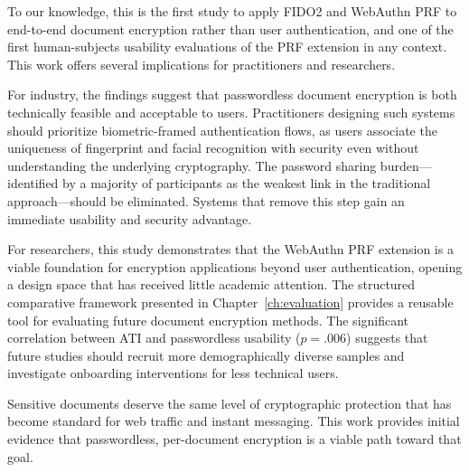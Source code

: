 To our knowledge, this is the first study to apply FIDO2 and WebAuthn PRF to end-to-end document encryption rather than user authentication, and one of the first human-subjects usability evaluations of the PRF extension in any context. This work offers several implications for practitioners and researchers.

For industry, the findings suggest that passwordless document encryption is both technically feasible and acceptable to users. Practitioners designing such systems should prioritize biometric-framed authentication flows, as users associate the uniqueness of fingerprint and facial recognition with security even without understanding the underlying cryptography. The password sharing burden---identified by a majority of participants as the weakest link in the traditional approach---should be eliminated. Systems that remove this step gain an immediate usability and security advantage.

For researchers, this study demonstrates that the WebAuthn PRF extension is a viable foundation for encryption applications beyond user authentication, opening a design space that has received little academic attention. The structured comparative framework presented in Chapter~\ref{ch:evaluation} provides a reusable tool for evaluating future document encryption methods. The significant correlation between ATI and passwordless usability ($p=.006$) suggests that future studies should recruit more demographically diverse samples and investigate onboarding interventions for less technical users.

Sensitive documents deserve the same level of cryptographic protection that has become standard for web traffic and instant messaging. This work provides initial evidence that passwordless, per-document encryption is a viable path toward that goal.
